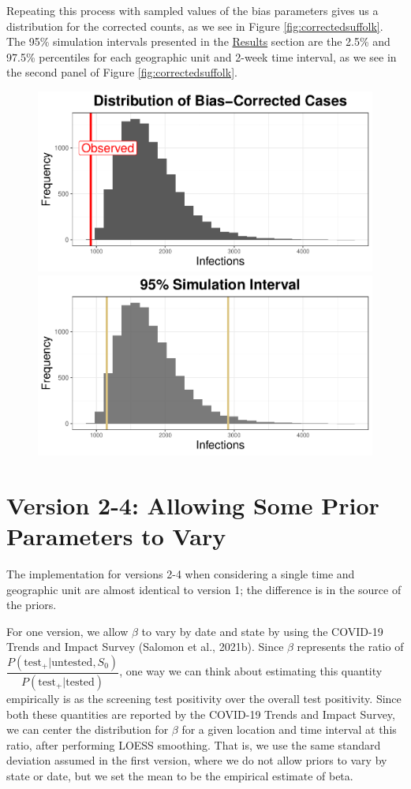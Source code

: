 \documentclass[12pt,twoside]{smiththesis}
\begin{document}
Repeating this process with sampled values of the bias parameters gives us a distribution for the corrected counts, as we see in Figure \ref{fig:correctedsuffolk}. The 95\% simulation intervals presented in the \protect\hyperlink{res}{Results} section are the 2.5\% and 97.5\% percentiles for each geographic unit and 2-week time interval, as we see in the second panel of Figure \ref{fig:correctedsuffolk}.
\begin{figure}
\includegraphics[width=0.5\linewidth]{thesis_files/figure-latex/unnamed-chunk-70-1} \includegraphics[width=0.5\linewidth]{thesis_files/figure-latex/unnamed-chunk-70-2} \caption{\label{fig:correctedsuffolk}}\label{fig:unnamed-chunk-70}
\end{figure}
\hypertarget{version-2-4-allowing-some-prior-parameters-to-vary}{%
\section{Version 2-4: Allowing Some Prior Parameters to Vary}\label{version-2-4-allowing-some-prior-parameters-to-vary}}

The implementation for versions 2-4 when considering a single time and geographic unit are almost identical to version 1; the difference is in the source of the priors.

For one version, we allow \(\beta\) to vary by date and state by using the COVID-19 Trends and Impact Survey (Salomon et al., 2021b). Since \(\beta\) represents the ratio of \(\dfrac{P(\text{test}_+|\text{untested},S_0)}{P(\text{test}_+|\text{tested})}\), one way we can think about estimating this quantity empirically is as the screening test positivity over the overall test positivity. Since both these quantities are reported by the COVID-19 Trends and Impact Survey, we can center the distribution for \(\beta\) for a given location and time interval at this ratio, after performing LOESS smoothing. That is, we use the same standard deviation assumed in the first version, where we do not allow priors to vary by state or date, but we set the mean to be the empirical estimate of beta.
\end{document}
